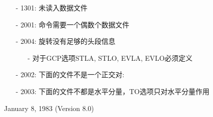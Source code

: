 \begin{itemize}
\item[-]1301: 未读入数据文件
\item[-]2001: 命令需要一个偶数个数据文件
\item[-]2004: 旋转没有足够的头段信息
	\begin{itemize}
	\item[-]对于GCP选项STLA, STLO, EVLA, EVLO必须定义
	\end{itemize}
\item[-]2002: 下面的文件不是一个正交对:
\item[-]2003: 下面的文件不都是水平分量，TO选项只对水平分量作用
\end{itemize}

January 8, 1983 (Version 8.0)
